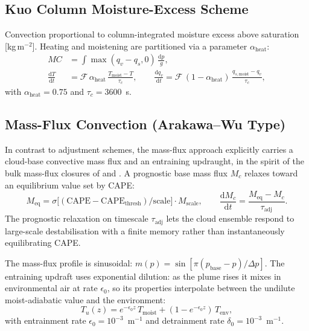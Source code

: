 \documentclass[11pt,twoside]{report}
\newcommand{\dd}{\mathrm{d}}
\begin{document}
\subsection{Kuo Column Moisture-Excess Scheme}

Convection proportional to column-integrated moisture excess above
saturation [kg\,m$^{-2}$].  Heating and moistening are partitioned
via a parameter $\alpha_{\mathrm{heat}}$:
\begin{align}
  MC &= \int \max(q_v - q_s, 0)\,\frac{\dd p}{g}, \\
  \frac{\dd T}{\dd t} &= \mathcal{F}\,\alpha_{\mathrm{heat}}\,
  \frac{T_{\mathrm{moist}}-T}{\tau_c}, \qquad
  \frac{\dd q_v}{\dd t} = \mathcal{F}\,(1-\alpha_{\mathrm{heat}})\,
  \frac{q_{s,\mathrm{moist}}-q_v}{\tau_c},
\end{align}
with $\alpha_{\mathrm{heat}}=0.75$ and $\tau_c=3600$~s.

\subsection{Mass-Flux Convection (Arakawa--Wu Type)}

In contrast to adjustment schemes, the mass-flux approach explicitly carries
a cloud-base convective mass flux and an entraining updraught, in the spirit
of the bulk mass-flux closures of \citet{Tiedtke1989} and
\citet{ZhangMcFarlane1995}. A prognostic base mass flux $M_c$ relaxes toward
an equilibrium value set by CAPE:
\begin{equation}
  M_{\mathrm{eq}} = \sigma\!\bigl[(\mathrm{CAPE}-\mathrm{CAPE}_{\mathrm{thresh}})
  /\mathrm{scale}\bigr]\cdot M_{\mathrm{scale}},
  \qquad
  \frac{\dd M_c}{\dd t} = \frac{M_{\mathrm{eq}}-M_c}{\tau_{\mathrm{adj}}}.
\end{equation}
The prognostic relaxation on timescale $\tau_{\mathrm{adj}}$ lets the cloud
ensemble respond to large-scale destabilisation with a finite memory rather
than instantaneously equilibrating CAPE.

The mass-flux profile is sinusoidal:
$m(p) = \sin[\pi(p_{\mathrm{base}}-p)/\Delta p]$.
The entraining updraft uses exponential dilution: as the plume rises it mixes
in environmental air at rate $\epsilon_0$, so its properties interpolate
between the undilute moist-adiabatic value and the environment:
\begin{equation}
  T_u(z) = e^{-\epsilon_0 z}\,T_{\mathrm{moist}}
  + (1-e^{-\epsilon_0 z})\,T_{\mathrm{env}},
\end{equation}
with entrainment rate $\epsilon_0=10^{-3}$~m$^{-1}$ and detrainment
rate $\delta_0=10^{-3}$~m$^{-1}$.
\end{document}

